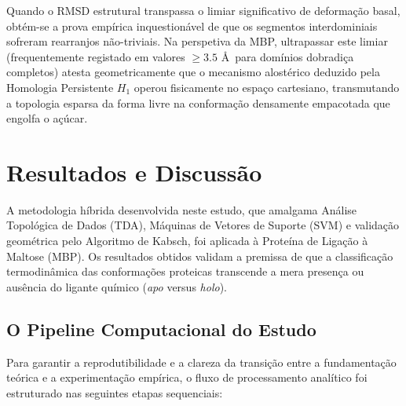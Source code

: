 \documentclass[12pt, a4paper]{article}
\begin{document}
Quando o RMSD estrutural transpassa o limiar significativo de deformação basal, obtém-se a prova empírica inquestionável de que os segmentos interdominiais sofreram rearranjos não-triviais. Na perspetiva da MBP, ultrapassar este limiar (frequentemente registado em valores $\geq 3.5$ \AA~para domínios dobradiça completos) atesta geometricamente que o mecanismo alostérico deduzido pela Homologia Persistente $H_1$ operou fisicamente no espaço cartesiano, transmutando a topologia esparsa da forma livre na conformação densamente empacotada que engolfa o açúcar.


\section{Resultados e Discussão}
\label{sec:resultados}

A metodologia híbrida desenvolvida neste estudo, que amalgama Análise Topológica de Dados (TDA), Máquinas de Vetores de Suporte (SVM) e validação geométrica pelo Algoritmo de Kabsch, foi aplicada à Proteína de Ligação à Maltose (MBP). Os resultados obtidos validam a premissa de que a classificação termodinâmica das conformações proteicas transcende a mera presença ou ausência do ligante químico (\textit{apo} versus \textit{holo}).

\subsection{O Pipeline Computacional do Estudo}
\label{sec:pipeline}

Para garantir a reprodutibilidade e a clareza da transição entre a fundamentação teórica e a experimentação empírica, o fluxo de processamento analítico foi estruturado nas seguintes etapas sequenciais:
\end{document}
